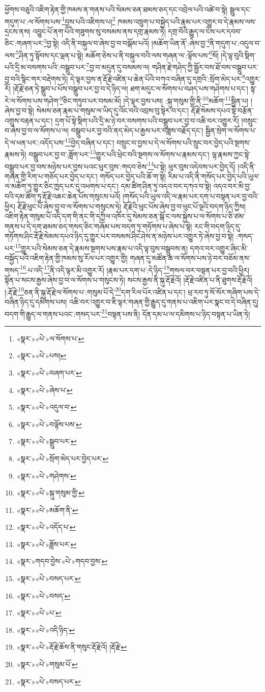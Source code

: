 ཕྱོགས་བཅུའི་འཇིག་རྟེན་གྱི་ཁམས་ན་གནས་པའི་སེམས་ཅན་ཐམས་ཅད་དང་འབྲེལ་པའི་འཚེ་བ་སྟེ། སྦྲུལ་དང་གདུག་པ་:ལ་སོགས་པས་\footnote{«སྣར་»«པེ་»ལ་སོགས་པ་}བྱས་པའི་འཇིགས་པ།\footnote{«སྣར་»«པེ་»པས།} ཁམས་འཁྲུག་པ་བསྐྱེད་པའི་རྣམ་པར་འགྱུར་བ་དེ་རྣམས་ལས་དྲངས་ནས། འབྱུང་པོ་ནག་པོའི་གཟུགས་སུ་བསམས་ནས་དགྲ་རྣམས་ཏེ། དགྲ་བོའི་རྒྱུད་ལ་ངེས་པར་དབབ་ཅིང་:གཞག་པར་\footnote{«སྣར་»«པེ་»བཞག་པར་}བྱ་སྟེ། འདི་ནི་བསྐུལ་བ་ཞེས་བྱ་བ་བསྒོམ་པའོ། །མཆོག་ཡིན་ནོ་:ཞེས་བྱ་\footnote{«སྣར་»«པེ་»ཞེས་པ་}ནི་གདུག་པ་:འདུལ་བ་ལས་\footnote{«སྣར་»«པེ་»འདུལ་བ་}ཤིན་ཏུ་སྟོབས་དང་ལྡན་པ་སྟེ། མཆོག་ཅེས་པ་ནི་བསྐུལ་བའི་ལས་གཞན་ལ་:ལྟོས་པས་\footnote{«སྣར་»«པེ་»བལྟོས་པས་}སོ། །དེ་ལྟ་བུའི་སྡིག་པའི་དྲི་མ་བསགས་པའི་:བསྒྲུབ་པར་\footnote{«སྣར་»«པེ་»སྒྲུབ་པར་}བྱ་བ་མདུན་དུ་བསམས་ལ། གཤིན་རྗེ་གཤེད་ཀྱི་སྦྱོར་བས་ཐོ་བས་བསྒྲུབ་པར་བྱ་བའི་སྙིང་གར་བརྡེགས་ཏེ། དེ་ལྟར་བྱས་ན་རྡོ་རྗེ་འཛིན་པ་ཆེན་པོའི་བཀའ་བཞིན་དུ་དགྲའི་:སྲོག་མེད་པར་\footnote{«སྣར་»«པེ་»སྲོག་མེད་པར་བྱེད་པར་}འགྱུར་རོ། །རྡོ་རྗེ་ཅན་ཏེ་སྒྲུབ་པ་པོས་བསྒྲུབ་པར་བྱ་བ་དེ་ཉིད་ལ། ཐག་མདུང་ལ་སོགས་པ་བཤད་པས་གཤེགས་པ་དང་། སྟ་རེ་ལ་སོགས་པས་གཤེག་\footnote{«སྣར་»«པེ་»གཤེགས་}ཅིང་གཏུབ་པར་བསམ་མོ། །དེ་ལྟར་བྱས་པས། :སྐུ་གསུམ་གྱི་ནི་\footnote{«སྣར་»«པེ་»སྐུ་གསུམ་གྱི་}མཆོག་\footnote{«སྣར་»«པེ་»མཆོག་ནི་}སྦྱིན་པ། །ཞེས་བྱ་བ་སྟེ། སེམས་ཅན་རྣམ་པ་གསུམ་ལ་ཡིད་དུ་འོང་བའི་འབྲས་བུ་སྟེར་བ་དང་། རྡོ་རྗེ་སེམས་དཔའ་སྟེ་བརྩོན་འགྲུས་བརྟན་པ་དང་། དྲག་པོ་སྟེ་སྡིག་པའི་དྲི་མ་ཉེ་བར་བསགས་པའི་བསྒྲུབ་པར་བྱ་བ་འཆི་བར་འགྱུར་རོ། །བསྲུང་བ་ཞེས་བྱ་བ་ལ་སོགས་པ་ལ། བསྒྲུབ་པར་བྱ་བའི་ནད་མེད་པ་རྒྱས་པར་བཟླས་བརྗོད་དང་། སྦྱིན་སྲེག་ལ་སོགས་པ་དེ་ལ་ཕན་པར་:འདོད་པས་\footnote{«སྣར་»«པེ་»འདོད་པ་}བྱེད་བཞིན་པ་དང་། བསྲུང་བ་བྱས་པ་དེ་ལ་སོགས་པའི་སྲུང་བར་བྱེད་པའི་སྔགས་རྣམས་ཏེ། བསྒྲུབ་པར་བྱ་བ་:ཟློག་པར་\footnote{«སྣར་»«པེ་»ཟློས་པར་}གྱུར་པའི་ཕྲེང་བའི་སྔགས་ལ་སོགས་པ་རྣམས་དང་། ལྷ་རྣམས་ཀྱང་སྟེ་བསྒྲུབ་པར་བྱ་བས་མཉེས་པར་བྱས་པའང་ཕུར་བུས་:གདབ་ཅེས་\footnote{«སྣར་»གདབ་བྱེས་«པེ་»གདབ་བྱས་}པ་སྟེ། ཕུར་བུས་འདེབས་པར་བྱེད་དོ། །འདི་ནི་གཞན་གྱི་རིག་པ་གཅོད་པར་བྱེད་པ་དང་། གསོད་པར་བྱེད་པའི་ཆོ་ག་སྟེ། རིམ་པ་འདི་ནི་གསོད་པར་བྱེད་པའི་ཡུལ་ལ་མཆོག་ཏུ་གྱུར་ཅིང་ཁྱད་པར་དུ་འཕགས་པ་དང་། དམ་ཚིག་ཤིན་ཏུ་འདའ་བར་དཀའ་བ་སྟེ། འདའ་བར་མི་བྱ་བའི་དམ་ཚིག་ཏུ་རྡོ་རྗེ་འཆང་ཆེན་པོས་གསུངས་པའོ། །གསོད་པའི་ཡུལ་འདི་ལ་རྣམ་པར་དག་པ་བསྟན་པར་བྱ་བའི་ཕྱིར། རྡོ་རྗེ་ཕུང་པོ་ཞེས་བྱ་བ་ལ་སོགས་པ་གསུངས་ཏེ། རྡོ་རྗེའི་ཕུང་པོས་ཞེས་བྱ་བ་ཕུང་པོ་ལྔའི་བདག་ཉིད་ཀྱིས། འཇིག་རྟེན་གསུམ་པོ་འདི་དག་གི་ནང་གི་དཀྱིལ་འཁོར་དུ་སེམས་ཅན་སྒོ་ང་ལས་སྐྱེས་པ་ལ་སོགས་པ་ཅི་ཙམ་གནས་པ་དེ་དག་ཐམས་ཅད་གསད་ཅིང་གཞོམ་པས་བདག་ཏུ་གཏོགས་པ་ཞེས་པ་སྟེ། རང་གི་བདག་ཉིད་དུ་གཏོགས་ཤིང་རྡོ་རྗེ་སེམས་དཔའ་ཉིད་དུ་གྱུར་པར་བསམས་ཤིང་ཤེས་ན་མཉེས་པར་འགྱུར་ཏེ་ཞེས་བྱ་བ་སྟེ། :གསད་པར་\footnote{«སྣར་»«པེ་»བསད་པར་}གྱུར་པའི་སེམས་ཅན་དེ་རྣམས་སྔགས་པས་རྣམ་པ་འདི་ལྟ་བུས་བསྒྲུབས་ན། དགའ་བར་འགྱུར་ཞིང་མི་བསྐྱོད་པའི་འཇིག་རྟེན་གྱི་ཁམས་སུ་རོལ་པར་འགྱུར་གྱི། གཞན་དུ་མཚོན་ཆ་ལ་སོགས་པས་ཉེ་བར་བཅོམ་ནས་གསད་\footnote{«སྣར་»«པེ་»བསད་}:པ་འདི་\footnote{«སྣར་»«པེ་»པ་}ནི་འདི་ལྟར་མི་འགྱུར་རོ། །རྣམ་པར་དག་པ་:དེ་ཉིད་\footnote{«སྣར་»«པེ་»འདི་ཉིད་}གསལ་བར་བསྟན་པར་བྱ་བའི་ཕྱིར། སྟོན་པ་སངས་རྒྱས་ཞེས་བྱ་བ་ལ་སོགས་པ་གསུངས་ཏེ། སངས་རྒྱས་ནི་སྐུ་རྡོ་རྗེའོ། །རྡོ་རྗེ་འཛིན་པ་ནི་ཐུགས་རྡོ་རྗེའོ། །:རྡོ་རྗེ་\footnote{«སྣར་»«པེ་»རྡོ་རྗེ་ཆོས་ནི་གསུང་རྡོ་རྗེའོ། །རྡོ་རྗེ་}ཅན་ནི་སྐུ་རྡོ་རྗེ་ལ་སོགས་པ་:གསུམ་པོ་དེ་\footnote{«སྣར་»«པེ་»གསུམ་པོ་}དག་རིལ་པོར་འཛིན་པ་དང་། ཕྲ་རབ་ཏུ་སོ་སོར་གཞིག་པས་དེ་བཞིན་ཉིད་དུ་དམིགས་པས། འཆི་བར་འགྱུར་བ་ཇི་ལྟར་གཞན་གྱི་རྒྱུད་དུ་གནས་པ་འཇིག་པར་སྣང་བ་དེ་བཞིན་དུ། བདག་གི་རྒྱུད་ལ་གནས་པའང་:གསད་པར་\footnote{«སྣར་»«པེ་»བསད་པར་}བསྟན་པས་ནི། དོན་དམ་པ་ལ་དམིགས་པ་ཉིད་བསྟན་པ་ཡིན་ཏེ། 